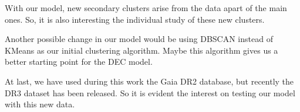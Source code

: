 \documentclass[11pt, a4paper, english]{book}
\begin{document}
With our model, new secondary clusters arise from the data apart of the main ones.
So, it is also interesting the individual study of these new clusters.

Another possible change in our model would be using DBSCAN instead of KMeans as our initial clustering algorithm.
Maybe this algorithm gives us a better starting point for the DEC model.

At last, we have used during this work the Gaia DR2 database, but recently the DR3 dataset has been released.
So it is evident the interest on testing our model with this new data.

\listoffigures
\listoftables

\newpage



\appendix

\end{document}
